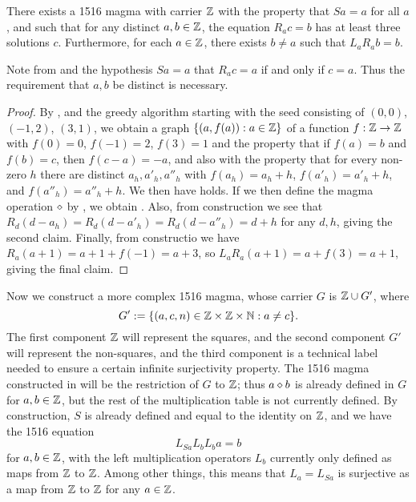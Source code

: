 \begin{corollary}\label{1516-base} There exists a 1516 magma with carrier $\mathbb{Z}$ with the property that $Sa=a$ for all $a$, and such that for any distinct $a,b \in \mathbb{Z}$, the equation $R_a c = b$ has at least three solutions $c$.  Furthermore, for each $a \in \mathbb{Z}$, there exists $b \neq a$ such that $L_a R_a b = b$.
\end{corollary}

Note from  and the hypothesis $Sa=a$ that $R_a c = a$ if and only if $c=a$.  Thus the requirement that $a,b$ be distinct is necessary.

\begin{proof}  By ,  and the greedy algorithm starting with the seed consisting of $(0,0)$, $(-1,2)$, $(3,1)$, we obtain a graph $\{ (a,f(a)): a \in \mathbb{Z} \}$ of a function $f:\mathbb{Z} \to \mathbb{Z}$ with $f(0)=0$, $f(-1)=2$, $f(3)=1$ and the property that if $f(a)=b$ and $f(b)=c$, then $f(c-a)=-a$, and also with the property that for every non-zero $h$ there are distinct $a_h, a'_h, a''_h$ with $f(a_h)=a_h+h$, $f(a'_h) = a'_h+h$, and $f(a''_h) = a''_h+h$.  We then have  holds.  If we then define the magma operation $\diamond$ by , we obtain .  Also, from construction we see that $R_d (d - a_h) = R_d (d - a'_h) = R_d (d - a''_h) = d+h$ for any $d,h$, giving the second claim.  Finally, from constructio we have $R_a (a+1) = a+1+f(-1) = a+3$, so $L_a R_a (a+1) = a + f(3) = a+1$, giving the final claim.
\end{proof}

Now we construct a more complex 1516 magma, whose carrier $G$ is $\mathbb{Z} \cup G'$, where
$$G' := \{ (a,c,n) \in \mathbb{Z} \times \mathbb{Z} \times \mathbb{N} : a \neq c\}.$$
The first component $\mathbb{Z}$ will represent the squares, and the second component $G'$ will represent the non-squares, and the third component is a technical label needed to ensure a certain infinite surjectivity property.  The 1516 magma constructed in  will be the restriction of $G$ to $\mathbb{Z}$; thus $a \diamond b$ is already defined in $G$ for $a,b \in \mathbb{Z}$, but the rest of the multiplication table is not currently defined.  By construction, $S$ is already defined and equal to the identity on $\mathbb{Z}$, and we have the 1516 equation
$$ L_{Sa} L_b L_b a = b$$
for $a,b \in \mathbb{Z}$, with the left multiplication operators $L_b$ currently only defined as maps from $\mathbb{Z}$ to $\mathbb{Z}$.  Among other things, this means that $L_a = L_{Sa}$ is surjective as a map from $\mathbb{Z}$ to $\mathbb{Z}$ for any $a \in \mathbb{Z}$.

